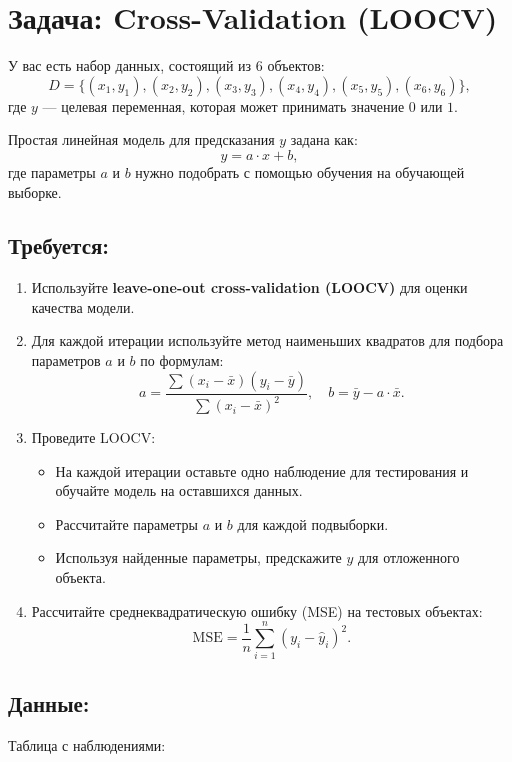 \section*{Задача: Cross-Validation (LOOCV)}

У вас есть набор данных, состоящий из 6 объектов:
\[
    D = \{ (x_1, y_1), (x_2, y_2), (x_3, y_3), (x_4, y_4), (x_5, y_5), (x_6, y_6) \},
\]
где \( y \) — целевая переменная, которая может принимать значение \( 0 \) или \( 1 \).

Простая линейная модель для предсказания \( y \) задана как:
\[
    y = a \cdot x + b,
\]
где параметры \( a \) и \( b \) нужно подобрать с помощью обучения на обучающей выборке.

\subsection*{Требуется:}
\begin{enumerate}
    \item Используйте \textbf{leave-one-out cross-validation (LOOCV)} для оценки качества модели.
    \item Для каждой итерации используйте метод наименьших квадратов для подбора параметров \( a \) и \( b \) по формулам:
          \[
              a = \frac{\sum (x_i - \bar{x})(y_i - \bar{y})}{\sum (x_i - \bar{x})^2}, \quad b = \bar{y} - a \cdot \bar{x}.
          \]
    \item Проведите LOOCV:
          \begin{itemize}
              \item На каждой итерации оставьте одно наблюдение для тестирования и обучайте модель на оставшихся данных.
              \item Рассчитайте параметры \( a \) и \( b \) для каждой подвыборки.
              \item Используя найденные параметры, предскажите \( y \) для отложенного объекта.
          \end{itemize}
    \item Рассчитайте среднеквадратическую ошибку (MSE) на тестовых объектах:
          \[
              \text{MSE} = \frac{1}{n} \sum_{i=1}^{n} (y_i - \hat{y}_i)^2.
          \]
\end{enumerate}

\subsection*{Данные:}
Таблица с наблюдениями:

